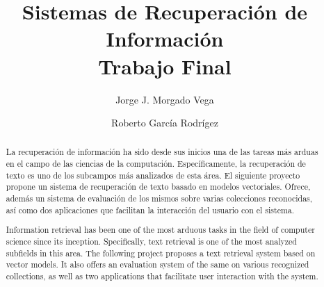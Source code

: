 \documentclass{llncs}
\begin{document}
\frontmatter
\pagestyle{headings}  %

\mainmatter              %
%
\title{Sistemas de Recuperación de Información\\ Trabajo Final}
%
%
\author{Jorge J. Morgado Vega \and Roberto García Rodrígez}
%
%
%

\maketitle              %

\renewcommand\abstractname{Resúmen.}
\renewcommand\keywordname{{\bf Palabras Claves:}}
\begin{abstract}
	La recuperación de información ha sido desde sus inicios una de las tareas
	más arduas en el campo de las ciencias de la computación. Específicamente,
	la recuperación de texto es uno de los subcampos más analizados de esta área.
	El siguiente proyecto propone un sistema de recuperación de texto basado
	en modelos vectoriales. Ofrece, además un sistema de evaluación de los mismos
	sobre varias colecciones reconocidas, así como dos aplicaciones que facilitan
	la interacción del usuario con el sistema.
\end{abstract}
\renewcommand\abstractname{Abstract.}
\renewcommand\keywordname{{\bf Keywords:}}
\begin{abstract}
	Information retrieval has been one of the most arduous tasks in the field
	of computer science since its inception. Specifically, text retrieval is
	one of the most analyzed subfields in this area. The following project
	proposes a text retrieval system based on vector models. It also offers an
	evaluation system of the same on various recognized collections, as well as
	two applications that facilitate user interaction with the system.
\end{abstract}
%
\end{document}
